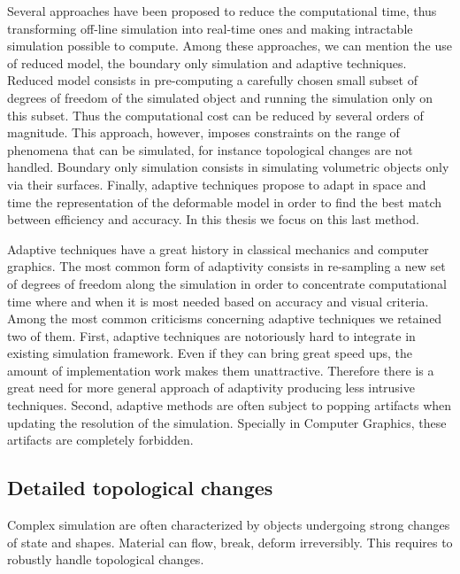 Several approaches have been proposed to reduce the computational time, thus transforming off-line simulation into real-time ones and making intractable simulation possible to compute. Among these approaches, we can mention the use of reduced model, the boundary only simulation and adaptive techniques. Reduced model consists in pre-computing a carefully chosen small subset of degrees of freedom of the simulated object and running the simulation only on this subset. Thus the computational cost can be reduced by several orders of magnitude. This approach, however, imposes constraints on the range of phenomena that can be simulated, for instance topological changes are not handled. Boundary only simulation consists in simulating volumetric objects only via their surfaces. Finally, adaptive techniques propose to adapt in space and time the representation of the deformable model in order to find the best match between efficiency and accuracy. In this thesis we focus on this last method.

Adaptive techniques have a great history in classical mechanics and computer graphics. The most common form of adaptivity consists in re-sampling a new set of degrees of freedom along the simulation in order to concentrate computational time where and when it is most needed based on accuracy and visual criteria. Among the most common criticisms concerning adaptive techniques we retained two of them. First, adaptive techniques are notoriously hard to integrate in existing simulation framework. Even if they can bring great speed ups, the amount of implementation work makes them unattractive. Therefore there is a great need for more general approach of adaptivity producing less intrusive techniques. Second, adaptive methods are often subject to popping artifacts when updating the resolution of the simulation. Specially in Computer Graphics, these artifacts are completely forbidden.

\subsection{Detailed topological changes}

Complex simulation are often characterized by objects undergoing strong changes of state and shapes. Material can flow, break, deform irreversibly. This requires to robustly handle topological changes. 

